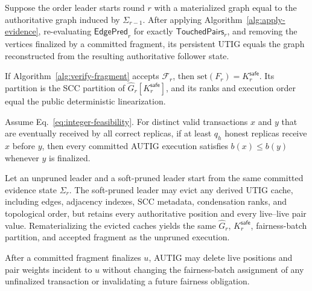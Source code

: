 \begin{theorem}
\label{thm:incremental-equivalence}
Suppose the order leader starts round $r$ with a materialized graph equal to
the authoritative graph induced by $\Sigma_{r-1}$.  After applying
Algorithm~\ref{alg:apply-evidence}, re-evaluating
$\mathsf{EdgePred}_r$ for exactly $\mathsf{TouchedPairs}_r$, and removing the
vertices finalized by a committed fragment, its persistent UTIG equals the
graph reconstructed from the resulting authoritative follower state.
\end{theorem}

\begin{theorem}
\label{thm:safe-fragment}
If Algorithm~\ref{alg:verify-fragment} accepts $\mathcal F_r$, then
$\mathrm{set}(F_r)=K_r^{\mathsf{safe}}$.  Its partition is the SCC partition
of $\widehat G_r[K_r^{\mathsf{safe}}]$, and its ranks and execution order equal
the public deterministic linearization.
\end{theorem}

\begin{theorem}
\label{thm:batch-fairness}
Assume Eq.~\eqref{eq:integer-feasibility}.  For distinct valid transactions
$x$ and $y$ that are eventually received by all correct replicas, if at least
$q_h$ honest replicas receive $x$ before $y$, then every committed AUTIG
execution satisfies $b(x)\le b(y)$ whenever $y$ is finalized.
\end{theorem}

\begin{theorem}
\label{thm:pruning_safety}
Let an unpruned leader and a soft-pruned leader start from the same committed
evidence state $\Sigma_r$.  The soft-pruned leader may evict any derived UTIG
cache, including edges, adjacency indexes, SCC metadata, condensation ranks,
and topological order, but retains every authoritative position and every
live--live pair value.  Rematerializing the evicted caches yields the same
$\widehat G_r$, $K_r^{\mathsf{safe}}$, fairness-batch partition, and accepted
fragment as the unpruned execution.
\end{theorem}

\begin{theorem}
\label{thm:hard-deletion}
After a committed fragment finalizes $u$, AUTIG may delete live positions and
pair weights incident to $u$ without changing the fairness-batch assignment
of any unfinalized transaction or invalidating a future fairness obligation.
\end{theorem}

